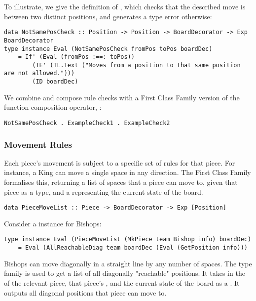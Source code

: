 To illustrate, we give the definition of , which checks that the described move is between two distinct positions, and generates a type error otherwise:

\begin{lstlisting}
data NotSamePosCheck :: Position -> Position -> BoardDecorator -> Exp BoardDecorator
type instance Eval (NotSamePosCheck fromPos toPos boardDec)
    = If' (Eval (fromPos :==: toPos))
        (TE' (TL.Text ("Moves from a position to that same position are not allowed.")))
        (ID boardDec)
\end{lstlisting}

We combine and compose rule checks with a First Class Family version of the function composition operator, :

\begin{lstlisting}
NotSamePosCheck . ExampleCheck1 . ExampleCheck2
\end{lstlisting}

\subsubsection{Movement Rules}

Each piece's movement is subject to a specific set of rules for that piece. For instance, a King can move a single space in any direction. The  First Class Family formalises this, returning a list of spaces that a piece can move to, given that piece as a  type, and a  representing the current state of the board.

\begin{lstlisting}
data PieceMoveList :: Piece -> BoardDecorator -> Exp [Position]
\end{lstlisting}

Consider a  instance for Bishops:

\begin{lstlisting}
type instance Eval (PieceMoveList (MkPiece team Bishop info) boardDec)
    = Eval (AllReachableDiag team boardDec (Eval (GetPosition info)))
\end{lstlisting}

Bishops can move diagonally in a straight line by any number of spaces. The type family  is used to get a list of all diagonally "reachable" positions. It takes in the  of the relevant piece, that piece's , and the current state of the board as a . It outputs all diagonal positions that piece can move to.

